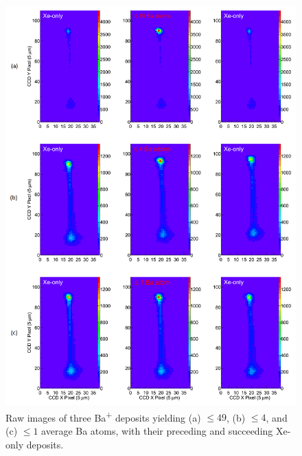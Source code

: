 \begin{figure} %
        \centering
                \includegraphics[width=.95\textwidth]{figures/xebaxe_average.png}
                \caption{Raw images of three Ba\textsuperscript{+} deposits yielding (a) $\leq 49$, (b) $\leq 4$, and (c) $\leq 1$ average Ba atoms, with their preceding and succeeding Xe-only deposits.}
\label{fig:xebaxe}
\end{figure}



